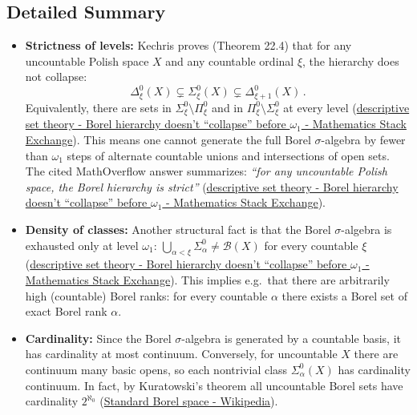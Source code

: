 \documentclass[11pt]{article}
\begin{document}
\subsection{Detailed Summary}
\label{detailed-summary-5}
\begin{itemize}
\item \textbf{Strictness of levels:} Kechris proves (Theorem 22.4) that for any
uncountable Polish space \(X\) and any countable ordinal \(\xi\), the
hierarchy does not collapse:
\[\Delta^0_\xi(X)\subsetneq\Sigma^0_\xi(X)\subsetneq\Delta^0_{\xi+1}(X)\,. \]
Equivalently, there are sets in \(\Sigma^0_\xi\setminus\Pi^0_\xi\) and
in \(\Pi^0_\xi\setminus\Sigma^0_\xi\) at every level
(\href{https://math.stackexchange.com/questions/509326/borel-hierarchy-doesnt-collapse-before-omega-1\#:\~:text=,0\_\%7B\%5Cxi\%2B1}{descriptive
set theory - Borel hierarchy doesn't ``collapse'' before \(\omega_1\) -
Mathematics Stack Exchange}). This means one cannot generate the full
Borel \(\sigma\)-algebra by fewer than \(\omega_1\) steps of alternate
countable unions and intersections of open sets. The cited
MathOverflow answer summarizes: \emph{“for any uncountable Polish space,
the Borel hierarchy is strict”}
(\href{https://math.stackexchange.com/questions/509326/borel-hierarchy-doesnt-collapse-before-omega-1\#:\~:text=,0\_\%7B\%5Cxi\%2B1}{descriptive
set theory - Borel hierarchy doesn't ``collapse'' before \(\omega_1\) -
Mathematics Stack Exchange}).

\item \textbf{Density of classes:} Another structural fact is that the Borel
\(\sigma\)-algebra is exhausted only at level \(\omega_1\):
\(\bigcup_{\alpha<\xi}\Sigma^0_\alpha\neq \mathcal{B}(X)\) for every
countable \(\xi\)
(\href{https://math.stackexchange.com/questions/509326/borel-hierarchy-doesnt-collapse-before-omega-1\#:\~:text=,0\_\%7B\%5Cxi\%2B1}{descriptive
set theory - Borel hierarchy doesn't ``collapse'' before \(\omega_1\) -
Mathematics Stack Exchange}). This implies e.g. that there are
arbitrarily high (countable) Borel ranks: for every countable
\(\alpha\) there exists a Borel set of exact Borel rank \(\alpha\).

\item \textbf{Cardinality:} Since the Borel \(\sigma\)-algebra is generated by a countable
basis, it has cardinality at most continuum. Conversely, for
uncountable \(X\) there are continuum many basic opens, so each
nontrivial class \(\Sigma^0_\alpha(X)\) has cardinality continuum. In
fact, by Kuratowski's theorem all uncountable Borel sets have
cardinality \(2^{\aleph_0}\)
(\href{https://en.wikipedia.org/wiki/Standard\_Borel\_space\#:\~:text=one\%20of\%20\%281\%29\%20Image\%3A\%20,is\%20reminiscent\%20of\%20Maharam\%27s\%20theorem}{Standard
Borel space - Wikipedia}).


\end{itemize}
\end{document}
